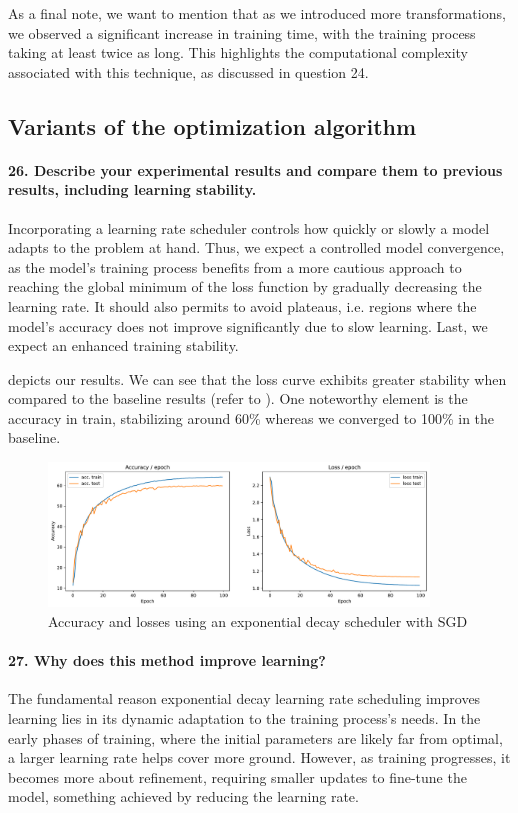 As a final note, we want to mention that as we introduced more transformations, we observed a significant increase in training time, with the training process taking at least twice as long. This highlights the computational complexity associated with this technique, as discussed in question 24.

\subsection{Variants of the optimization algorithm}
\paragraph{26. Describe your experimental results and compare them to previous results, including learning stability.}

Incorporating a learning rate scheduler controls how quickly or slowly a model adapts to the problem at hand. Thus, we expect a controlled model convergence, as the model's training process benefits from a more cautious approach to reaching the global minimum of the loss function by gradually decreasing the learning rate. It should also permits to avoid plateaus, i.e. regions where the model's accuracy does not improve significantly due to slow learning. Last, we expect an enhanced training stability.

 depicts our results. We can see that the loss curve exhibits greater stability when compared to the baseline results (refer to ). One noteworthy element is the accuracy in train, stabilizing around 60\% whereas we converged to 100\% in the baseline. 

\begin{figure}[H]
    \centering
    \includegraphics*[width=0.9\textwidth]{figs/CNN/optim_variants.pdf}
    \caption{Accuracy and losses using an exponential decay scheduler with SGD}
    \label{fig:optim_variants}
\end{figure}

\paragraph{27. Why does this method improve learning?}
The fundamental reason exponential decay learning rate scheduling improves learning lies in its dynamic adaptation to the training process's needs. In the early phases of training, where the initial parameters are likely far from optimal, a larger learning rate helps cover more ground. However, as training progresses, it becomes more about refinement, requiring smaller updates to fine-tune the model, something achieved by reducing the learning rate.

